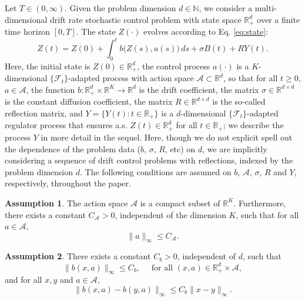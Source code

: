 \documentclass[11pt]{article}
\theoremstyle{definition}
\newtheorem{assumption}{Assumption}[section]
\theoremstyle{plain}
\newcommand{\R}{\mathbb{R}}
\newcommand{\N}{\mathbb{N}}
\begin{document}
Let $T \in (0, \infty)$. Given the problem dimension $d \in \N$, 
we consider a multi-dimensional drift rate stochastic control problem with state space $\mathbb{R}_+^d$ over a finite time horizon $[0, T]$. 
The state $Z(\cdot)$ evolves according to Eq. \eqref{eq:state}: %
\begin{equation*}%
Z(t) = Z(0) + \int_0^t b\bigl(Z(s), a(s)\bigr)\,ds + \sigma B(t) + RY(t). 
\end{equation*}
Here, the initial state is $Z(0) \in \mathbb{R}_+^d$, the control process $a(\cdot)$ is a $K$-dimensional $\{\mathcal{F}_t\}$-adapted process 
with action space $\mathcal{A} \subset \mathbb{R}^d$, so that for all $t\geq 0$, $a \in \mathcal{A}$, 
the function $b : \mathbb{R}_+^d \times \mathbb{R}^K \to \mathbb{R}^d$ is the drift coefficient, 
the matrix $\sigma \in \mathbb{R}^{d\times d}$ is the constant diffusion coefficient, 
the matrix $R \in \mathbb{R}^{d\times d}$ is the so-called reflection matrix, 
and $Y = \{Y(t) : t\in \mathbb{R}_+\}$ is a $d$-dimensional $\{\mathcal{F}_t\}$-adapted regulator process that ensures a.s. $Z(t) \in \mathbb{R}_+^d$ for all $t\in \mathbb{R}_+$; 
we describe the process $Y$ in more detail in the sequel.
Here, though we do not explicit spell out the dependence of the problem data ($b$, $\sigma$, $R$, etc) on $d$, 
we are implicitly considering a sequence of drift control problems with reflections, indexed by the problem dimension $d$.
The following conditions are assumed on $b$, $\mathcal{A}$, $\sigma$, $R$ and $Y$, respectively, throughout the paper. 
\begin{assumption}\label{as:Theta}
The action space $\mathcal{A}$ is a compact subset of $\R^K$. Furthermore, 
there exists a constant $C_\mathcal{A} > 0$, independent of the dimension $K$, such that for all $a \in \mathcal{A}$, 
\begin{equation}
\|a\|_\infty \leq C_\mathcal{A}.
\end{equation}
\end{assumption}
\begin{assumption}\label{as:b}
There exists a constant $C_b > 0$, independent of $d$, such that
\begin{equation}
\| b(x, a) \|_\infty \leq C_b, \quad \text{ for all } (x, a) \in \mathbb{R}_+^d \times \mathcal{A}, 
\end{equation}
and for all $x, y$ and $a \in \mathcal{A}$, 
\begin{equation}
\|b(x,a) - b(y, a)\|_\infty \leq C_b \|x-y\|_\infty.
\end{equation}
\end{assumption}
\end{document}
